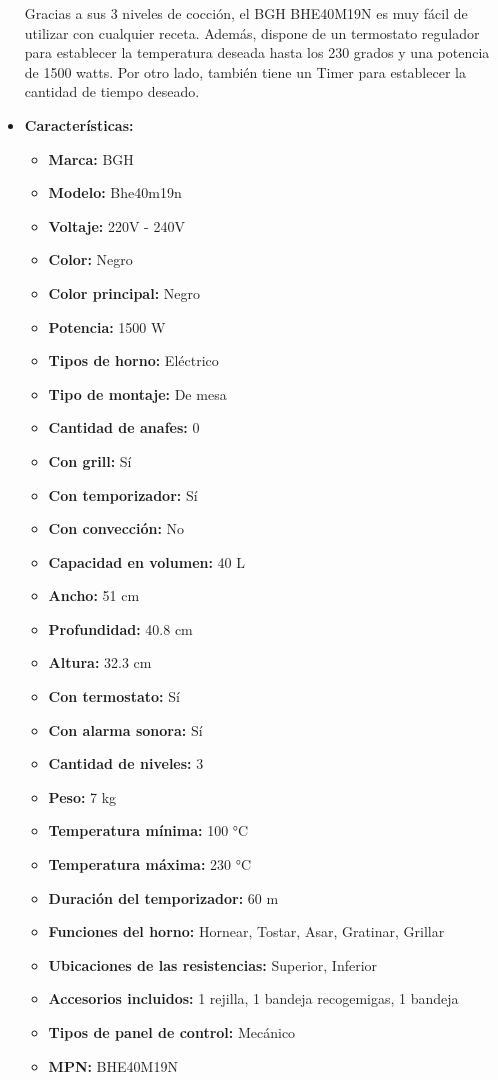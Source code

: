 \documentclass{article}
\begin{document}
\begin{adjustwidth}{2em}{}
\begin{itemize}
Gracias a sus 3 niveles de cocción, el BGH BHE40M19N es muy fácil de utilizar con cualquier receta. Además, dispone de un termostato regulador para establecer la temperatura deseada hasta los 230 grados y una potencia de 1500 watts. Por otro lado, también tiene un Timer para establecer la cantidad de tiempo deseado.
    \item \textbf{Características:} 
    \begin{itemize}
        \item \textbf {Marca:} BGH
    \item \textbf {Modelo:} Bhe40m19n
    \item \textbf {Voltaje:} 220V - 240V
    \item \textbf {Color:} Negro
    \item \textbf {Color principal:} Negro
    \item \textbf {Potencia:} 1500 W
    \item \textbf {Tipos de horno:} Eléctrico
    \item \textbf {Tipo de montaje:} De mesa
    \item \textbf {Cantidad de anafes:} 0
    \item \textbf {Con grill:} Sí
    \item \textbf {Con temporizador:} Sí
    \item \textbf {Con convección:} No
    \item \textbf {Capacidad en volumen:} 40 L
    \item \textbf {Ancho:} 51 cm
    \item \textbf {Profundidad:} 40.8 cm
    \item \textbf {Altura:} 32.3 cm
    \item \textbf {Con termostato:} Sí
    \item \textbf {Con alarma sonora:} Sí
    \item \textbf {Cantidad de niveles:} 3
    \item \textbf {Peso:} 7 kg
    \item \textbf {Temperatura mínima:} 100 °C
    \item \textbf {Temperatura máxima:} 230 °C
    \item \textbf {Duración del temporizador:} 60 m
    \item \textbf {Funciones del horno:} Hornear, Tostar, Asar, Gratinar, Grillar
    \item \textbf {Ubicaciones de las resistencias:} Superior, Inferior
    \item \textbf {Accesorios incluidos:} 1 rejilla, 1 bandeja recogemigas, 1 bandeja
    \item \textbf {Tipos de panel de control:} Mecánico
    \item \textbf {MPN:} BHE40M19N
    \end{itemize}
\end{itemize}

\vspace{1\baselineskip} %
\end{adjustwidth}
\end{document}
